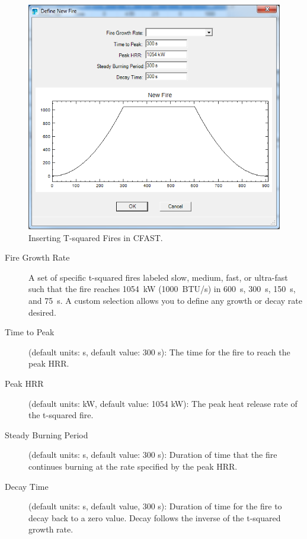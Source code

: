 \begin{figure}[h!]
\begin{center}
\includegraphics[width=5in]{FIGURES/Create_t2}
\caption[Inserting T-squared Fires in CFAST]{Inserting T-squared Fires in CFAST.}
\end{center}
\end{figure}

\begin{description}
\item[Fire Growth Rate] A set of specific t-squared fires labeled slow, medium, fast, or ultra-fast such that the fire reaches 1054~kW (1000~BTU/s) in 600~s, 300~s, 150~s, and 75~s.  A custom selection allows you to define any growth or decay rate desired.
\item[Time to Peak] (default units: s, default value: 300 s): The time for the fire to reach the peak HRR.
\item[Peak HRR] (default units: kW, default value: 1054 kW): The peak heat release rate of the t-squared fire.
\item[Steady Burning Period] (default units: s, default value: 300 s): Duration of time that the fire continues burning at the rate specified by the peak HRR.
\item[Decay Time] (default units: s, default value, 300 s): Duration of time for the fire to decay back to a zero value.  Decay follows the inverse of the t-squared growth rate.
\end{description}




